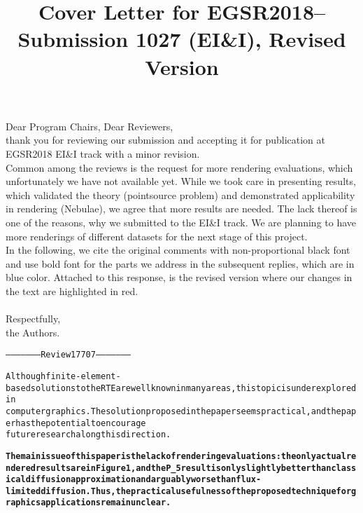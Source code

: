 \documentclass[11pt,letterpaper,headsepline,DIV15]{scrartcl}
\title{\normalsize Cover Letter for EGSR2018-- Submission 1027 (EI\&I), Revised Version}
\date{}
\def\bf{\normalfont\bfseries}
\newcommand{\tocomment}[1]{\bf#1}
\begin{document}
\maketitle
\noindent Dear Program Chairs, Dear Reviewers,
\\

\noindent thank you for reviewing our submission and accepting it for publication at EGSR2018 EI\&I track with a minor revision.
\\

\noindent Common among the reviews is the request for more rendering evaluations, which unfortunately we have not available yet. While we took care in presenting results, which validated the theory (pointsource problem) and demonstrated applicability in rendering (Nebulae), we agree that more results are needed. The lack thereof is one of the reasons, why we submitted to the EI\&I track. We are planning to have more renderings of different datasets for the next stage of this project.
\\

\noindent In the following, we cite the original comments with non-proportional black font and use bold font for the parts we address in the subsequent replies, which are in blue color. Attached to this response, is the revised version where our changes in the text are highlighted in red.
\\
\\
\noindent Respectfully,\\
the Authors.

\clearpage


\vspace{0.5cm}






{\scriptsize\begin{alltt}
-------------------- Review 17707 --------------------

Although finite-element-based solutions to the RTE are well known in many areas, this topic is underexplored in
computer graphics. The solution proposed in the paper seems practical, and the paper has the potential to encourage
future research along this direction.

\tocomment{
The main issue of this paper is the lack of rendering evaluations: the only actual rendered results are in Figure 1, and the P_5 result is only slightly better than classical diffusion approximation and arguably worse than flux-limited diffusion. Thus, the practical usefulness of the proposed technique for graphics applications remain unclear.
}
\end{alltt}}
\end{document}

